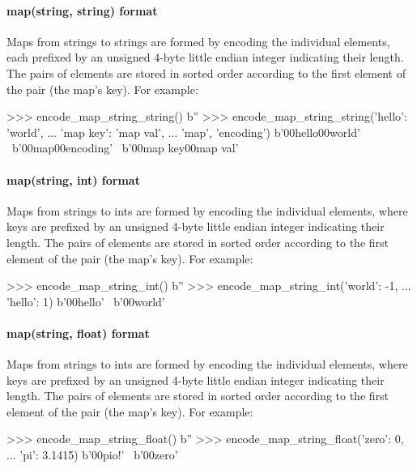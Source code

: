 \paragraph{map(string, string) format}

Maps from strings to strings are formed by encoding the individual elements,
each prefixed by an unsigned 4-byte little endian integer indicating their
length.  The pairs of elements are stored in sorted order according to the first
element of the pair (the map's key).  For example:

\begin{pythoncode}
>>> encode_map_string_string({})
b''
>>> encode_map_string_string({'hello': 'world',
...                           'map key': 'map val',
...                           'map', 'encoding'})
b'\x00hello\x00world' \
b'\x00map\x00encoding' \
b'\x00map key\x00map val'
\end{pythoncode}

\paragraph{map(string, int) format}

Maps from strings to ints are formed by encoding the individual elements, where
keys are prefixed by an unsigned 4-byte little endian integer indicating their
length.  The pairs of elements are stored in sorted order according to the first
element of the pair (the map's key).  For example:

\begin{pythoncode}
>>> encode_map_string_int({})
b''
>>> encode_map_string_int({'world': -1,
...                        'hello': 1})
b'\x05hello\x01\x00\x00\x00\x00\x00' \
b'\x00world\xff\xff\xff\xff\xff\xff\xff\xff'
\end{pythoncode}

\paragraph{map(string, float) format}

Maps from strings to ints are formed by encoding the individual elements, where
keys are prefixed by an unsigned 4-byte little endian integer indicating their
length.  The pairs of elements are stored in sorted order according to the first
element of the pair (the map's key).  For example:

\begin{pythoncode}
>>> encode_map_string_float({})
b''
>>> encode_map_string_float({'zero': 0,
...                          'pi': 3.1415})
b'\x00pio\xca!\t@' \
b'\x00zero'
\end{pythoncode}

